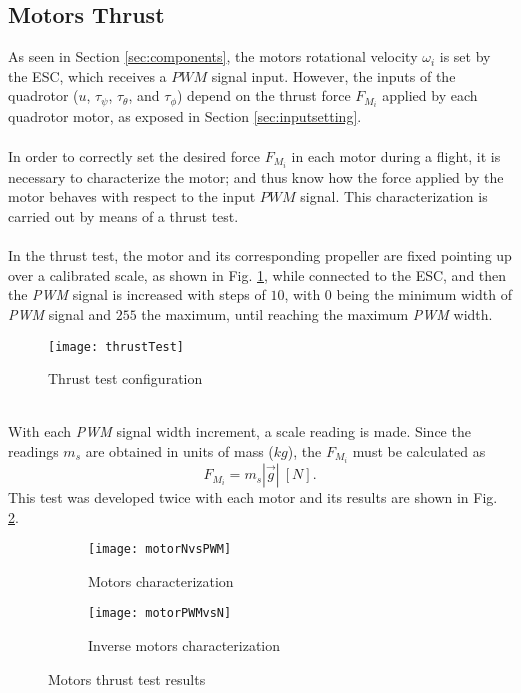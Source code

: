 \subsection{Motors Thrust}
As seen in Section \ref{sec:components}, the motors rotational velocity $\omega_{i}$ is set by the ESC, which receives a $PWM$ signal input. However, the inputs of the quadrotor ($u$, $\tau_\psi$, $\tau_\theta$, and $\tau_\phi$) depend on the thrust force $F_{M_{i}}$ applied by each quadrotor motor, as exposed in Section \ref{sec:inputsetting}.
\\\\
In order to correctly set the desired force $F_{M_{i}}$ in each motor during a flight, it is necessary to characterize the motor; and thus know how the force applied by the motor behaves with respect to the input $PWM$ signal. This characterization is carried out by means of a thrust test.
\\\\
In the thrust test, the motor and its corresponding propeller are fixed pointing up over a calibrated scale, as shown in Fig. \ref{fig:thrusttest}, while connected to the ESC, and then the \textit{PWM} signal is increased with steps of $10$, with $0$ being the minimum width of \textit{PWM} signal and $255$ the maximum, until reaching the maximum \textit{PWM} width. 
\begin{figure}[h]
	\begin{center}
		\texttt{[image: thrustTest]}    
		\caption{Thrust test configuration} 
		\label{fig:thrusttest}
	\end{center}
\end{figure}
\\With each  \textit{PWM} signal width increment, a scale reading is made. Since the readings $m_{s}$ are obtained in units of mass ($kg$), the $F_{M_i}$ must be calculated as
\begin{equation}
F_{M_i} = m_{s}|\vec{g}|\ [N].
\end{equation}
This test was developed twice with each motor and its results are shown in Fig. \ref{fig:motor}.
\begin{figure}[H]
\begin{subfigure}{.5\linewidth}
\centering
\texttt{[image: motorNvsPWM]}
\caption{Motors characterization}
\label{fig:motor}
\end{subfigure}%
\begin{subfigure}{.5\linewidth}
\centering
\texttt{[image: motorPWMvsN]}
\caption{Inverse motors characterization}
\label{fig:inversemotor}
\end{subfigure}
\caption{Motors thrust test results}
\label{fig:test}
\end{figure}
